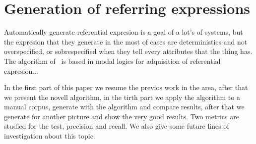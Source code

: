 \section{Generation of referring expressions}\label{sec:gre}


Automatically generate referential expresion is a goal of a lot's of systems, but the expresion that they generate in the most of cases are deterministics and not overspecified, or sobrespecified when they tell every attributes that the thing has.
The algorithm of~\cite{areces08} is based in modal logics for adquisition of referential expresion...

In the first part of this paper we resume the previos work in the area, after that we present the novell algorithm, in the tirth part we apply the algorithm to a manual corpus, generate with the algorithm and compare results, after that we generate for another picture and show the very good results. Two metrics are studied for the test, precision and recall. We also give some future lines of investigation about this topic.  


\cite{paig:thre87}
